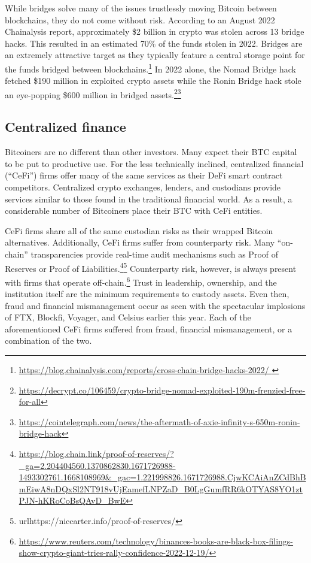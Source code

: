 \documentclass[twoside, a4paper, 11pt]{article}
\begin{document}
  While bridges solve many of the issues trustlessly moving Bitcoin between blockchains, they do not come without risk. According to an August 2022 Chainalysis report, approximately \$2 billion in crypto was stolen across 13 bridge hacks. This resulted in an estimated 70\% of the funds stolen in 2022. Bridges are an extremely attractive target as they typically feature a central storage point for the funds bridged between blockchains.\footnote{\url{https://blog.chainalysis.com/reports/cross-chain-bridge-hacks-2022/
  }}  In 2022 alone, the Nomad Bridge hack fetched \$190 million in exploited crypto assets while the Ronin Bridge hack stole an eye-popping \$600 million in bridged assets.\footnote{\url{https://decrypt.co/106459/crypto-bridge-nomad-exploited-190m-frenzied-free-for-all}}\footnote{\url{https://cointelegraph.com/news/the-aftermath-of-axie-infinity-s-650m-ronin-bridge-hack}}

  \subsection{Centralized finance}

  Bitcoiners are no different than other investors. Many expect their BTC capital to be put to productive use. For the less technically inclined, centralized financial (“CeFi”) firms offer many of the same services as their DeFi smart contract competitors. Centralized crypto exchanges, lenders, and custodians provide services similar to those found in the traditional financial world. As a result, a considerable number of Bitcoiners place their BTC with CeFi entities.

  CeFi firms share all of the same custodian risks as their wrapped Bitcoin alternatives. Additionally, CeFi firms suffer from counterparty risk. Many “on-chain” transparencies provide real-time audit mechanisms such as Proof of Reserves or Proof of Liabilities.\footnote{\url{https://blog.chain.link/proof-of-reserves/?_ga=2.204404560.1370862830.1671726988-1493302761.1668108969&_gac=1.221998826.1671726988.CjwKCAiAnZCdBhBmEiwA8nDQxSl2NT918vUjEamefLNPZaD_B0LgGumfRR6kOTYAS8YO1ztPJN-hKRoCoBsQAvD_BwE}}\footnote{url{https://niccarter.info/proof-of-reserves/}} Counterparty risk, however, is always present with firms that operate off-chain.\footnote{\url{https://www.reuters.com/technology/binances-books-are-black-box-filings-show-crypto-giant-tries-rally-confidence-2022-12-19/}}  Trust in leadership, ownership, and the institution itself are the minimum requirements to custody assets. Even then, fraud and financial mismanagement occur as seen with the spectacular implosions of FTX, Blockfi, Voyager, and Celsius earlier this year. Each of the aforementioned CeFi firms suffered from fraud, financial mismanagement, or a combination of the two.
\end{document}
